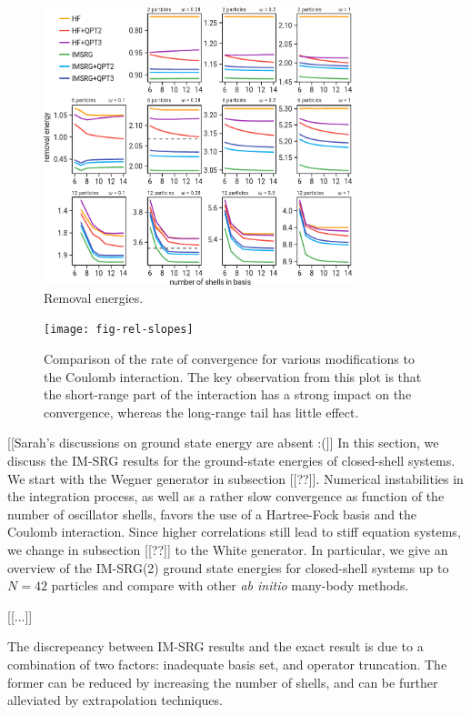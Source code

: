 \begin{figure}
  \centering
  \includegraphics[width=0.8\textwidth]{fig-rm}
  \caption{Removal energies.}
  \label{fig:rm}
\end{figure}

\begin{figure}
  \centering
  \texttt{[image: fig-rel-slopes]}
  \caption{Comparison of the rate of convergence for various modifications to the Coulomb interaction.  The key observation from this plot is that the short-range part of the interaction has a strong impact on the convergence, whereas the long-range tail has little effect.}
  \label{fig:rel-slopes}
\end{figure}

[[Sarah's discussions on ground state energy are absent :(]]
In this section, we discuss the IM-SRG results for the ground-state energies of closed-shell systems.  We start with the Wegner generator in subsection [[??]].  Numerical instabilities in the integration process, as well as a rather slow convergence as function of the number of oscillator shells, favors the use of a Hartree-Fock basis and the Coulomb interaction.  Since higher correlations still lead to stiff equation systems, we change in subsection [[??]] to the White generator. In particular, we give an overview of the IM-SRG(2) ground state energies for closed-shell systems up to $N=42$ particles and compare with other \textit{ab initio} many-body methods.

[[...]]


The discrepeancy between IM-SRG results and the exact result is due to a combination of two factors: inadequate basis set, and operator truncation.
The former can be reduced by increasing the number of shells, and can be further alleviated by extrapolation techniques.

